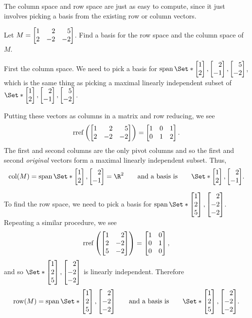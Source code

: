 The column space and row space are just as easy to compute, since it just involves picking
a basis from the existing row or column vectors.

\begin{example}
	Let $M=\mat{1&2&5\\2&-2&-2}$. Find a basis for the row space and the column space of $M$.

	\medskip
	First the column space. We need to pick a basis for $\Span\Set*{\mat{1\\2},\mat{2\\-1},\mat{5\\-2}}$,
	which is the same thing as picking a maximal linearly independent subset of $\Set*{\mat{1\\2},\mat{2\\-1},\mat{5\\-2}}$.

	Putting these vectors as columns in a matrix and row reducing, we see
	\[
		\Rref\left(\mat{1&2&5\\2&-2&-2}\right) = \mat{1&0&1\\0&1&2}.
	\]
	The first and second columns are the only pivot columns and so the first and second \emph{original} vectors
	form a maximal linearly independent subset. Thus,
	\[
		\Col(M) = \Span\Set*{\mat{1\\2},\mat{2\\-1}} = \R^2\qquad\text{and a basis is}\qquad \Set*{\mat{1\\2},\mat{2\\-1}}.
	\]

	To find the row space, we need to pick a basis for $\Span\Set*{\mat{1\\2\\5},\mat{2\\-2\\-2}}$. Repeating
	a similar procedure, we see
	\[
		\Rref\left(\mat{1&2\\2&-2\\5&-2}\right) = \mat{1&0\\0&1\\0&0},
	\]
	and so $\Set*{\mat{1\\2\\5},\mat{2\\-2\\-2}}$ is linearly independent. Therefore
	\[
		\Row(M)=\Span\Set*{\mat{1\\2\\5},\mat{2\\-2\\-2}}\qquad\text{and a basis is}\qquad \Set*{\mat{1\\2\\5},\mat{2\\-2\\-2}}.
	\]
\end{example}

